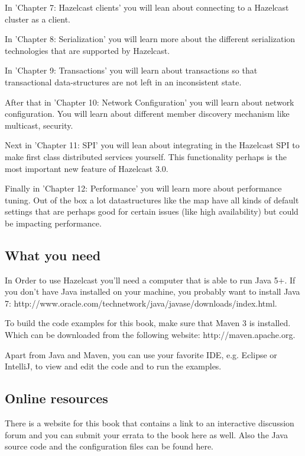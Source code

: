 In 'Chapter 7: Hazelcast clients' you will lean about connecting to a Hazelcast cluster as a client.

In 'Chapter 8: Serialization' you will learn more about the different serialization technologies that are supported by Hazelcast.

In 'Chapter 9: Transactions' you will learn about transactions so that transactional data-structures are not left in an inconsistent state.

After that in 'Chapter 10: Network Configuration' you will learn about network configuration. You will learn about different member discovery mechanism like multicast, security. 

Next in 'Chapter 11: SPI' you will lean about integrating in the Hazelcast SPI to make first class distributed services yourself. This functionality perhaps is the most important new feature of Hazelcast 3.0.

Finally in 'Chapter 12: Performance'  you will learn more about performance tuning.  Out of the box a lot datastructures like the map have all kinds of default settings that are perhaps good for certain issues (like high availability) but could be impacting performance. 

\subsection*{What you need}
In Order to use Hazelcast you'll need a computer that is able to run Java 5+. If you don't have Java installed on your machine, you probably want to install Java 7: 
http://www.oracle.com/technetwork/java/javase/downloads/index.html. 

To build the code examples for this book, make sure that Maven 3 is installed. Which can be downloaded from the following website: http://maven.apache.org.

Apart from Java and Maven, you can use your favorite IDE, e.g. Eclipse or IntelliJ, to view and edit the code and to run the examples. 

\subsection*{Online resources}
There is a website for this book that contains a link to an interactive discussion forum and you can submit your errata to the book here as well. Also the Java source code and the configuration files can be found here. 

